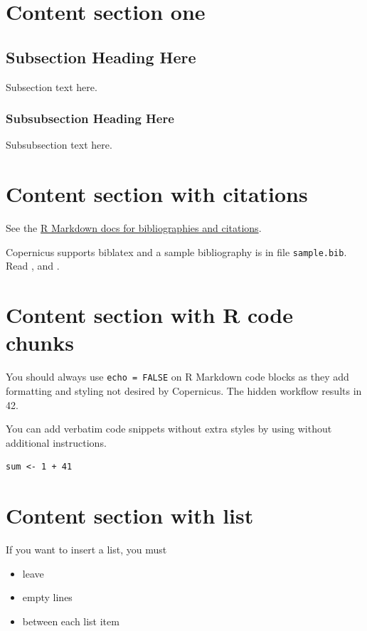 \documentclass[gc, manuscript]{copernicus}
\begin{document}
\section{Content section one}

\subsection{Subsection Heading Here}

Subsection text here.

\subsubsection{Subsubsection Heading Here}

Subsubsection text here.

\section{Content section with citations}

See the
\href{http://rmarkdown.rstudio.com/authoring_bibliographies_and_citations.html}{R
Markdown docs for bibliographies and citations}.

Copernicus supports biblatex and a sample bibliography is in file
\texttt{sample.bib}. Read \citep{Feynman1963118}, and
\citep[see][]{Dirac1953888}.

\section{Content section with R code chunks}

You should always use \texttt{echo\ =\ FALSE} on R Markdown code blocks
as they add formatting and styling not desired by Copernicus. The hidden
workflow results in 42.

You can add verbatim code snippets without extra styles by using
\texttt{\textasciigrave{}\textasciigrave{}\textasciigrave{}} without
additional instructions.

\begin{verbatim}
sum <- 1 + 41
\end{verbatim}

\section{Content section with list}

If you want to insert a list, you must

\begin{itemize}
\item
  leave
\item
  empty lines
\item
  between each list item
\end{itemize}
\end{document}
